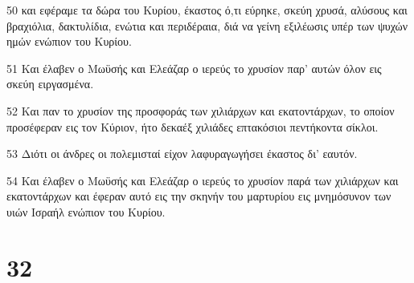 \par 50 και εφέραμε τα δώρα του Κυρίου, έκαστος ό,τι εύρηκε, σκεύη χρυσά, αλύσους και βραχιόλια, δακτυλίδια, ενώτια και περιδέραια, διά να γείνη εξιλέωσις υπέρ των ψυχών ημών ενώπιον του Κυρίου.
\par 51 Και έλαβεν ο Μωϋσής και Ελεάζαρ ο ιερεύς το χρυσίον παρ' αυτών όλον εις σκεύη ειργασμένα.
\par 52 Και παν το χρυσίον της προσφοράς των χιλιάρχων και εκατοντάρχων, το οποίον προσέφεραν εις τον Κύριον, ήτο δεκαέξ χιλιάδες επτακόσιοι πεντήκοντα σίκλοι.
\par 53 Διότι οι άνδρες οι πολεμισταί είχον λαφυραγωγήσει έκαστος δι' εαυτόν.
\par 54 Και έλαβεν ο Μωϋσής και Ελεάζαρ ο ιερεύς το χρυσίον παρά των χιλιάρχων και εκατοντάρχων και έφεραν αυτό εις την σκηνήν του μαρτυρίου εις μνημόσυνον των υιών Ισραήλ ενώπιον του Κυρίου.

\chapter{32}

